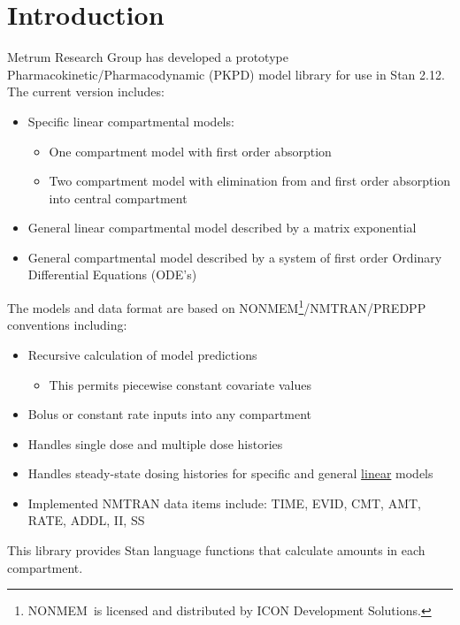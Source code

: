 \documentclass[11pt]{amsart}
\let\oldsection\section
\renewcommand\section{\clearpage\oldsection}
\begin{document}
\section{Introduction}
Metrum Research Group has developed a prototype Pharmacokinetic/Pharmacodynamic (PKPD) model library for use in Stan 2.12. The current version includes:
\begin{itemize}
  \item Specific linear compartmental models:
  \begin{itemize}
    \item One compartment model with first order absorption
    \item Two compartment model with elimination from and first order absorption into central compartment
  \end{itemize}
  \item General linear compartmental model described by a matrix exponential
  \item General compartmental model described by a system of first order Ordinary Differential Equations (ODE's)
\end{itemize}

The models and data format are based on NONMEM\textregistered\footnote{NONMEM\textregistered\ is licensed and distributed by ICON Development Solutions.}/NMTRAN/PREDPP conventions including:
\begin{itemize}
  \item Recursive calculation of model predictions
  \begin{itemize}
    \item This permits piecewise constant covariate values
  \end{itemize}
  \item Bolus or constant rate inputs into any compartment
  \item Handles single dose and multiple dose histories
  \item Handles steady-state dosing histories for specific and general \underline{linear} models
  \item Implemented NMTRAN data items include: TIME, EVID, CMT, AMT, RATE, ADDL, II, SS
\end{itemize}
This library provides Stan language functions that calculate amounts in each compartment.
    
\end{document}

